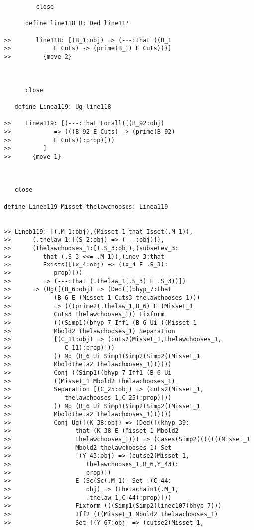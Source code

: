 \documentclass[12pt]{article}
\begin{document}
\begin{verbatim}
         close

      define line118 B: Ded line117

>>       line118: [(B_1:obj) => (---:that ((B_1
>>            E Cuts) -> (prime(B_1) E Cuts)))]
>>         {move 2}



      close

   define Linea119: Ug line118

>>    Linea119: [(---:that Forall([(B_92:obj)
>>            => (((B_92 E Cuts) -> (prime(B_92)
>>            E Cuts)):prop)]))
>>         ]
>>      {move 1}



   close

define Lineb119 Misset thelawchooses: Linea119


>> Lineb119: [(.M_1:obj),(Misset_1:that Isset(.M_1)),
>>      (.thelaw_1:[(S_2:obj) => (---:obj)]),
>>      (thelawchooses_1:[(.S_3:obj),(subsetev_3:
>>         that (.S_3 <<= .M_1)),(inev_3:that
>>         Exists([(x_4:obj) => ((x_4 E .S_3):
>>            prop)]))
>>         => (---:that (.thelaw_1(.S_3) E .S_3))])
>>      => (Ug([(B_6:obj) => (Ded([(bhyp_7:that
>>            (B_6 E (Misset_1 Cuts3 thelawchooses_1)))
>>            => (((prime2(.thelaw_1,B_6) E (Misset_1
>>            Cuts3 thelawchooses_1)) Fixform
>>            (((Simp1((bhyp_7 Iff1 (B_6 Ui ((Misset_1
>>            Mbold2 thelawchooses_1) Separation
>>            [(C_11:obj) => (cuts2(Misset_1,thelawchooses_1,
>>               C_11):prop)]))
>>            )) Mp (B_6 Ui Simp1(Simp2(Simp2((Misset_1
>>            Mboldtheta2 thelawchooses_1))))))
>>            Conj ((Simp1((bhyp_7 Iff1 (B_6 Ui
>>            ((Misset_1 Mbold2 thelawchooses_1)
>>            Separation [(C_25:obj) => (cuts2(Misset_1,
>>               thelawchooses_1,C_25):prop)]))
>>            )) Mp (B_6 Ui Simp1(Simp2(Simp2((Misset_1
>>            Mboldtheta2 thelawchooses_1))))))
>>            Conj Ug([(K_38:obj) => (Ded([(khyp_39:
>>                  that (K_38 E (Misset_1 Mbold2
>>                  thelawchooses_1))) => (Cases(Simp2(((((((Misset_1
>>                  Mbold2 thelawchooses_1) Set
>>                  [(Y_43:obj) => (cutse2(Misset_1,
>>                     thelawchooses_1,B_6,Y_43):
>>                     prop)])
>>                  E (Sc(Sc(.M_1)) Set [(C_44:
>>                     obj) => (thetachain1(.M_1,
>>                     .thelaw_1,C_44):prop)]))
>>                  Fixform (((Simp1(Simp2(linec107(bhyp_7)))
>>                  Iff2 (((Misset_1 Mbold2 thelawchooses_1)
>>                  Set [(Y_67:obj) => (cutse2(Misset_1,

\end{verbatim}
\end{document}
